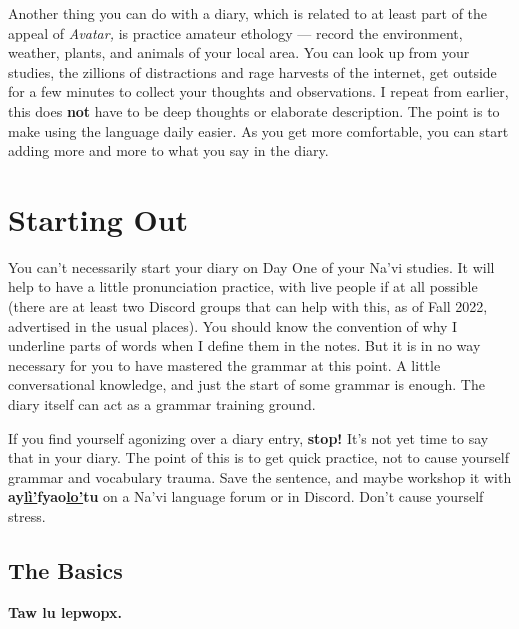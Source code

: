 \documentclass[nofonts]{tufte-handout}
\newcommand{\N}[1]{\textbf{\textcolor{navi}{#1}}}
\begin{document}
Another thing you can do with a diary, which is related to at least
part of the appeal of \textit{Avatar,} is practice amateur ethology —
record the environment, weather, plants, and animals of your local
area.  You can look up from your studies, the zillions of distractions
and rage harvests of the internet, get outside for a few minutes to
collect your thoughts and observations.  
I repeat from earlier, this does \textbf{not} have to be deep thoughts
or elaborate description.  The point is to make using the language
daily easier.  As you get more comfortable, you can start adding more
and more to what you say in the diary.


\section*{Starting Out}

You can't necessarily start your diary on Day One of your Na'vi
studies.  It will help to have a little pronunciation practice, with
live people if at all possible (there are at least two Discord groups
that can help with this, as of Fall 2022, advertised in the usual
places).  You should know the convention of why I underline parts of
words when I define them in the notes.  But it is in no
way necessary for you to have mastered the grammar at this
point.   A little conversational
knowledge, and just the start of some grammar is enough.  The diary
itself can act as a grammar training ground.

If you find yourself agonizing over a diary entry, \textbf{stop!}
It's not yet time to say that in your diary.  The point of this is to
get quick practice, not to cause yourself grammar and vocabulary
trauma.  Save the sentence, and maybe workshop it with
\N{ay\uline{lì'}fyao\uline{lo'}tu} on a Na'vi language forum or in
Discord.  Don't cause yourself stress.

\subsection*{The Basics}
\N{Taw lu lepwopx.}\marginnote{\N{taw}: ``sky;'' \N{lu}: ``be;''
  \N{lep\uline{wopx}}: ``cloudy.''  \textit{It's cloudy.}}
\end{document}
